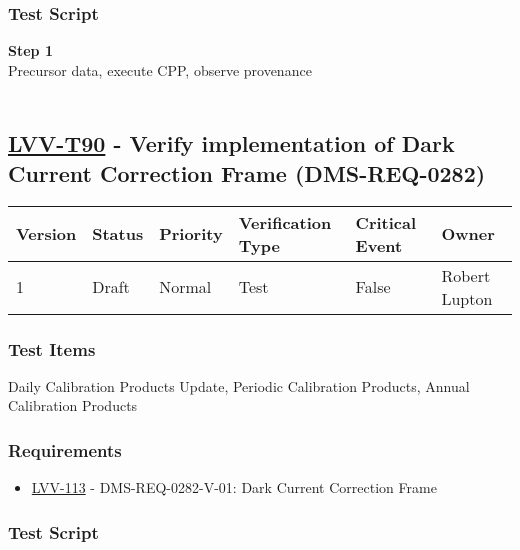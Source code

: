 \hypertarget{test-script-66}{%
\subsubsection{Test Script}\label{test-script-66}}

\textbf{Step 1}\\
Precursor data, execute CPP, observe provenance\\
~\\

\hypertarget{lvv-t90---verify-implementation-of-dark-current-correction-frame-dms-req-0282}{%
\subsection{\texorpdfstring{\href{https://jira.lsstcorp.org/secure/Tests.jspa\#/testCase/LVV-T90}{LVV-T90}
- Verify implementation of Dark Current Correction Frame
(DMS-REQ-0282)}{LVV-T90 - Verify implementation of Dark Current Correction Frame (DMS-REQ-0282)}}\label{lvv-t90---verify-implementation-of-dark-current-correction-frame-dms-req-0282}}

\begin{longtable}[]{@{}llllll@{}}
\toprule
Version & Status & Priority & Verification Type & Critical Event &
Owner\tabularnewline
\midrule
\endhead
1 & Draft & Normal & Test & False & Robert Lupton\tabularnewline
\bottomrule
\end{longtable}

\hypertarget{test-items-66}{%
\subsubsection{Test Items}\label{test-items-66}}

Daily Calibration Products Update, Periodic Calibration Products, Annual
Calibration Products~

\hypertarget{requirements-67}{%
\subsubsection{Requirements}\label{requirements-67}}

\begin{itemize}
\tightlist
\item
  \href{https://jira.lsstcorp.org/browse/LVV-113}{LVV-113} -
  DMS-REQ-0282-V-01: Dark Current Correction Frame
\end{itemize}

\hypertarget{test-script-67}{%
\subsubsection{Test Script}\label{test-script-67}}

